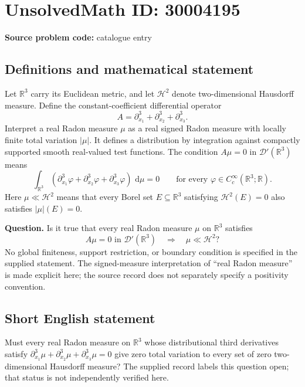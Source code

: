 \documentclass[11pt]{article}
\newcommand{\R}{\mathbb{R}}
\newcommand{\dd}{\,\mathrm{d}}
\begin{document}
\section*{UnsolvedMath ID: 30004195}
\textbf{Source problem code:} catalogue entry
\subsection{Definitions and mathematical statement}
Let \(\R^3\) carry its Euclidean metric, and let \(\mathcal H^2\) denote two-dimensional Hausdorff measure. Define the constant-coefficient differential operator
\[
A=\partial_{x_1}^3+\partial_{x_2}^3+\partial_{x_3}^3.
\]
Interpret a real Radon measure \(\mu\) as a real signed Radon measure with locally finite total variation \(|\mu|\). It defines a distribution by integration against compactly supported smooth real-valued test functions. The condition \(A\mu=0\) in \(\mathcal D'(\R^3)\) means
\[
\int_{\R^3}\left(\partial_{x_1}^3\varphi+\partial_{x_2}^3\varphi+\partial_{x_3}^3\varphi\right)\,\dd\mu=0
\qquad\text{for every }\varphi\in C_c^\infty(\R^3;\R).
\]
Here \(\mu\ll\mathcal H^2\) means that every Borel set \(E\subseteq\R^3\) satisfying \(\mathcal H^2(E)=0\) also satisfies \(|\mu|(E)=0\).

\textbf{Question.} Is it true that every real Radon measure \(\mu\) on \(\R^3\) satisfies
\[
A\mu=0\text{ in }\mathcal D'(\R^3)
\quad\Longrightarrow\quad
\mu\ll\mathcal H^2?
\]
No global finiteness, support restriction, or boundary condition is specified in the supplied statement. The signed-measure interpretation of ``real Radon measure'' is made explicit here; the source record does not separately specify a positivity convention.
\subsection{Short English statement}
Must every real Radon measure on \(\R^3\) whose distributional third derivatives satisfy \(\partial_{x_1}^3\mu+\partial_{x_2}^3\mu+\partial_{x_3}^3\mu=0\) give zero total variation to every set of zero two-dimensional Hausdorff measure? The supplied record labels this question open; that status is not independently verified here.
\end{document}
